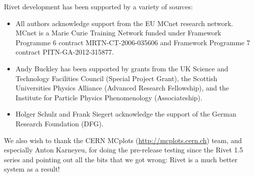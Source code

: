 Rivet development has been supported by a variety of sources:

\begin{itemize}
\item All authors acknowledge support from the EU MCnet research network. MCnet
  is a Marie Curie Training Network funded under Framework Programme 6
  contract MRTN-CT-2006-035606 and Framework Programme 7 contract PITN-GA-2012-315877.
\item Andy Buckley has been supported by grants from the UK Science and
  Technology Facilities Council (Special Project Grant), the Scottish
  Universities Physics Alliance (Advanced Research Fellowship), and the
  Institute for Particle Physics Phenomenology (Associateship).
\item Holger Schulz and Frank Siegert acknowledge the support of the German
  Research Foundation (DFG).
\end{itemize}

We also wish to thank the CERN MCplots (\url{http://mcplots.cern.ch}) team, and
especially Anton Karneyeu, for doing the pre-release testing since the Rivet 1.5
series and pointing out all the bits that we got wrong: Rivet is a much better
system as a result!
